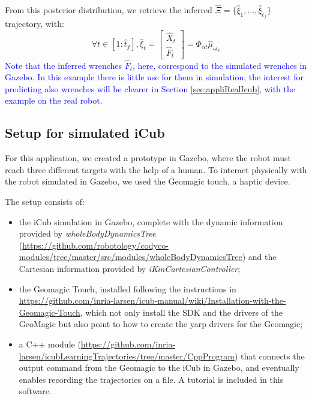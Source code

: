 \documentclass[utf8]{frontiersSCNS} %
\newcommand{\rev}[1]{\textcolor{blue}{#1}}
\begin{document}
From this posterior distribution, we retrieve the inferred  $\hat{\Xi} = \{ \hat{\xi}_1,..., \hat{\xi}_{\hat{t}_f}\}$ trajectory, with:
$$ \forall t \in [1:\hat{t}_f],\hat{\xi}_t = \begin{bmatrix} \hat{X}_t \\ \hat{F}_t\end{bmatrix} =  \Phi_{\alpha t} \hat{\mu}_{\boldsymbol{\omega}_k} $$
\rev{Note that the inferred wrenches $\hat{F}_t$, here, correspond to the simulated wrenches in Gazebo. In this example there is little use for them in simulation; the interest for predicting also wrenches will be clearer in Section \ref{sec:appliRealIcub}, with the example on the real robot.} 


\subsection{Setup for simulated iCub}
\label{subec:Setup}
For this application, we created a prototype in Gazebo, where the robot must reach three different targets with the help of a human. To interact physically with the robot simulated in Gazebo, we used the Geomagic touch, a haptic device.

The setup consists of:
\begin{itemize}
\item the iCub simulation in Gazebo, complete with the dynamic information provided by \textit{wholeBodyDynamicsTree} (\url{https://github.com/robotology/codyco-modules/tree/master/src/modules/wholeBodyDynamicsTree}) and the Cartesian information provided by \textit{iKinCartesianController};
\item the Geomagic Touch, installed following the instructions in \url{https://github.com/inria-larsen/icub-manual/wiki/Installation-with-the-Geomagic-Touch}, which not only install the SDK and the drivers of the GeoMagic but also point to how to create the yarp drivers for the Geomagic;
\item a C++ module (\url{https://github.com/inria-larsen/icubLearningTrajectories/tree/master/CppProgram}) that connects the output command from the Geomagic to the iCub in Gazebo, and eventually enables recording the trajectories on a file. A tutorial is included in this software.
\end{itemize}
\end{document}
